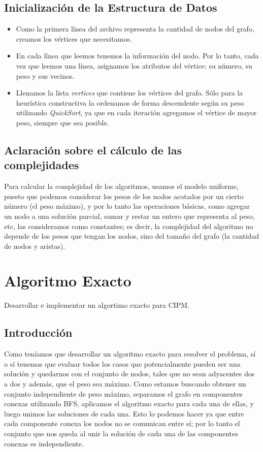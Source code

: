 \documentclass[a4paper, 10pt]{article}
\begin{document}
\subsection{Inicializaci\'on de la Estructura de Datos}
\begin{itemize}
\item Como la primera l\'inea del archivo representa la cantidad de nodos del grafo, creamos los v\'ertices que necesitamos.
\item En cada l\'inea que leemos tenemos la informaci\'on del nodo. Por lo tanto, cada vez que leemos una l\'inea, asignamos los atributos del v\'ertice: su n\'umero, su peso y sus vecinos.
\item Llenamos la lista \textit{vertices} que contiene los v\'ertices del grafo. S\'olo para la heur\'istica constructiva la ordenamos de forma descendente seg\'un su peso utilizando \textit{QuickSort}, ya que en cada iteraci\'on agregamos el v\'ertice de mayor peso, siempre que sea posible.
\end{itemize}

\subsection{Aclaraci\'on sobre el c\'alculo de las complejidades}
Para calcular la complejidad de los algoritmos, usamos el modelo uniforme, puesto que podemos considerar los pesos de los nodos acotados por un cierto n\'umero (el peso m\'aximo), y por lo tanto las operaciones b\'asicas, como agregar un nodo a una soluci\'on parcial, sumar y restar un entero que representa al peso, etc, las consideramos como constantes; es decir, la complejidad del algoritmo no depende de los pesos que tengan los nodos, sino del tama\~no del grafo (la cantidad de nodos y aristas).

\newpage

\section{Algoritmo Exacto}
Desarrollar e implementar un algortimo exacto para CIPM.

\subsection{Introducci\'on}
Como ten\'iamos que desarrollar un algoritmo exacto para resolver el problema, s\'i o s\'i tenemos que evaluar todos los casos que potencialmente pueden ser una soluci\'on y quedarnos con el conjunto de nodos, tales que no sean adyacentes dos a dos y adem\'as, que el peso sea m\'aximo. Como estamos buscando obtener un conjunto independiente de peso m\'aximo, separamos el grafo en componentes conexas utilizando BFS, aplicamos el algoritmo exacto para cada una de ellas, y luego unimos las soluciones de cada una. Esto lo podemos hacer ya que entre cada componente conexa los nodos no se comunican entre s\'i; por lo tanto el conjunto que nos queda al unir la soluci\'on de cada una de las componentes conexas es independiente. \\
\end{document}
